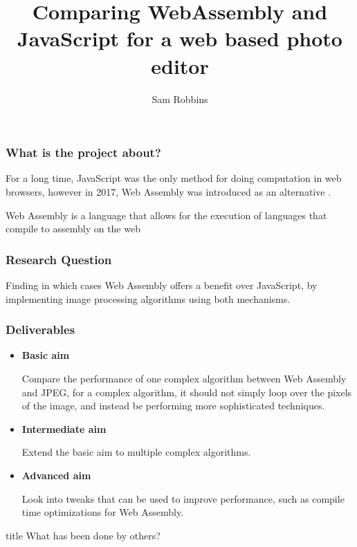 \documentclass{beamer}
\title{Comparing WebAssembly and JavaScript for a web based photo editor}
\author{Sam Robbins}
\institute{Durham University}
\date{}
\begin{document}
\frame{\titlepage}

\begin{frame}
    \frametitle{What is the project about?}

    For a long time, JavaScript was the only method for doing computation in web browsers, however in 2017, Web Assembly was introduced as an alternative \cite{haas2017bringing}.

    \begin{definition}
        Web Assembly is a language that allows for the execution of languages that compile to assembly on the web
    \end{definition}




\end{frame}

\begin{frame}
    \frametitle{Research Question}
    Finding in which cases Web Assembly offers a benefit over JavaScript, by implementing image processing algorithms using both mechanisms.
\end{frame}

\begin{frame}
    \frametitle{Deliverables}
    \begin{itemize}
        \item \textbf{Basic aim}

              Compare the performance of one complex algorithm between Web Assembly and JPEG, for a complex algorithm, it should not simply loop over the pixels of the image, and instead be performing more sophisticated techniques.
        \item \textbf{Intermediate aim}

              Extend the basic aim to multiple complex algorithms.
        \item \textbf{Advanced aim}

              Look into tweaks that can be used to improve performance, such as compile time optimizations for Web Assembly.
    \end{itemize}
\end{frame}

\begin{frame}
    \vfill
    \centering
    \begin{beamercolorbox}[sep=8pt,center,shadow=true,rounded=true]{title}
         What has been done by others?\par%
    \end{beamercolorbox}
    \vfill
\end{frame}
\end{document}
